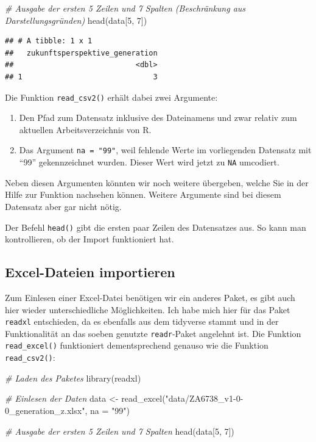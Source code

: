 \documentclass[
]{book}
\newenvironment{Shaded}{\begin{snugshade}}{\end{snugshade}}
\newcommand{\AttributeTok}[1]{\textcolor[rgb]{0.77,0.63,0.00}{#1}}
\newcommand{\CommentTok}[1]{\textcolor[rgb]{0.56,0.35,0.01}{\textit{#1}}}
\newcommand{\DecValTok}[1]{\textcolor[rgb]{0.00,0.00,0.81}{#1}}
\newcommand{\FunctionTok}[1]{\textcolor[rgb]{0.00,0.00,0.00}{#1}}
\newcommand{\NormalTok}[1]{#1}
\newcommand{\OtherTok}[1]{\textcolor[rgb]{0.56,0.35,0.01}{#1}}
\newcommand{\StringTok}[1]{\textcolor[rgb]{0.31,0.60,0.02}{#1}}
\begin{document}
\begin{Shaded}
\begin{Highlighting}[]
\CommentTok{\# Ausgabe der ersten 5 Zeilen und 7 Spalten (Beschränkung aus Darstellungsgründen)}
\FunctionTok{head}\NormalTok{(data[}\DecValTok{5}\NormalTok{, }\DecValTok{7}\NormalTok{])}
\end{Highlighting}
\end{Shaded}

\begin{verbatim}
## # A tibble: 1 x 1
##   zukunftsperspektive_generation
##                            <dbl>
## 1                              3
\end{verbatim}

Die Funktion \texttt{read\_csv2()} erhält dabei zwei Argumente:

\begin{enumerate}
\def\labelenumi{\arabic{enumi}.}
\item
  Den Pfad zum Datensatz inklusive des Dateinamens und zwar relativ zum aktuellen Arbeitsverzeichnis von R.
\item
  Das Argument \texttt{na\ =\ "99"}, weil fehlende Werte im vorliegenden Datensatz mit ``99'' gekennzeichnet wurden. Dieser Wert wird jetzt zu \texttt{NA} umcodiert.
\end{enumerate}

Neben diesen Argumenten könnten wir noch weitere übergeben, welche Sie in der Hilfe zur Funktion nachsehen können. Weitere Argumente sind bei diesem Datensatz aber gar nicht nötig.

Der Befehl \texttt{head()} gibt die ersten paar Zeilen des Datensatzes aus. So kann man kontrollieren, ob der Import funktioniert hat.

\hypertarget{excel-dateien-importieren}{%
\subsection{Excel-Dateien importieren}\label{excel-dateien-importieren}}

Zum Einlesen einer Excel-Datei benötigen wir ein anderes Paket, es gibt auch hier wieder unterschiedliche Möglichkeiten. Ich habe mich hier für das Paket \texttt{readxl} entschieden, da es ebenfalls aus dem tidyverse stammt und in der Funktionalität an das soeben genutzte \texttt{readr}-Paket angelehnt ist. Die Funktion \texttt{read\_excel()} funktioniert dementsprechend genauso wie die Funktion \texttt{read\_csv2()}:

\begin{Shaded}
\begin{Highlighting}[]
\CommentTok{\# Laden des Paketes}
\FunctionTok{library}\NormalTok{(readxl)}

\CommentTok{\# Einlesen der Daten}
\NormalTok{data }\OtherTok{\textless{}{-}} \FunctionTok{read\_excel}\NormalTok{(}\StringTok{"data/ZA6738\_v1{-}0{-}0\_generation\_z.xlsx"}\NormalTok{, }\AttributeTok{na =} \StringTok{"99"}\NormalTok{)}

\CommentTok{\# Ausgabe der ersten 5 Zeilen und 7 Spalten}
\FunctionTok{head}\NormalTok{(data[}\DecValTok{5}\NormalTok{, }\DecValTok{7}\NormalTok{])}
\end{Highlighting}
\end{Shaded}
\end{document}
